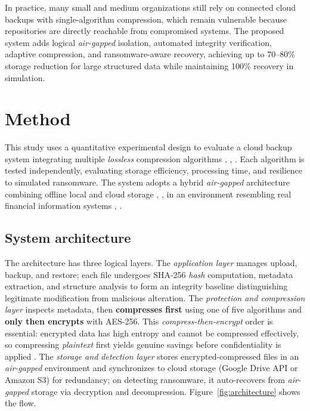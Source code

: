 \documentclass{iaesarticle}
\begin{document}
In practice, many small and medium organizations still rely on connected cloud backups with single-algorithm compression, which remain vulnerable because repositories are directly reachable from compromised systems. The proposed system adds logical \textit{air-gapped} isolation, automated integrity verification, adaptive compression, and ransomware-aware recovery, achieving up to 70--80\% storage reduction for large structured data while maintaining 100\% recovery in simulation.

\section{Method}
\label{sec:method}
This study uses a quantitative experimental design to evaluate a cloud backup system integrating multiple \textit{lossless} compression algorithms \cite{22}, \cite{24}, \cite{25}. Each algorithm is tested independently, evaluating storage efficiency, processing time, and resilience to simulated ransomware. The system adopts a hybrid \textit{air-gapped} architecture combining offline local and cloud storage \cite{21}, \cite{27}, in an environment resembling real financial information systems \cite{28}, \cite{29}.

\subsection{System architecture}
The architecture has three logical layers. The \emph{application layer} manages upload, backup, and restore; each file undergoes SHA-256 \textit{hash} computation, metadata extraction, and structure analysis to form an integrity baseline distinguishing legitimate modification from malicious alteration. The \emph{protection and compression layer} inspects metadata, then \textbf{compresses first} using one of five algorithms and \textbf{only then encrypts} with AES-256. This \textit{compress-then-encrypt} order is essential: encrypted data has high entropy and cannot be compressed effectively, so compressing \textit{plaintext} first yields genuine savings before confidentiality is applied \cite{9}. The \emph{storage and detection layer} stores encrypted-compressed files in an \textit{air-gapped} environment and synchronizes to cloud storage (Google Drive API or Amazon S3) for redundancy; on detecting ransomware, it auto-recovers from \textit{air-gapped} storage via decryption and decompression. Figure~\ref{fig:architecture} shows the flow.
\end{document}
